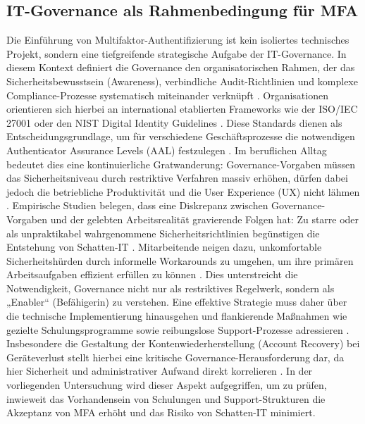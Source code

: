 \subsection{IT-Governance als Rahmenbedingung für MFA}
Die Einführung von Multifaktor-Authentifizierung ist kein isoliertes technisches Projekt, sondern eine tiefgreifende strategische Aufgabe der IT-Governance. In diesem Kontext definiert die Governance den organisatorischen Rahmen, der das Sicherheitsbewusstsein ({Awareness}), verbindliche Audit-Richtlinien und komplexe Compliance-Prozesse systematisch miteinander verknüpft \cite[S. 6]{1}. 
Organisationen orientieren sich hierbei an international etablierten Frameworks wie der ISO/IEC 27001 oder den {NIST Digital Identity Guidelines} \cite[S. 6]{1}. Diese Standards dienen als Entscheidungsgrundlage, um für verschiedene Geschäftsprozesse die notwendigen {Authenticator Assurance Levels} (AAL) festzulegen \cite[S. 6, 13]{1}. Im beruflichen Alltag bedeutet dies eine kontinuierliche Gratwanderung: Governance-Vorgaben müssen das Sicherheitsniveau durch restriktive Verfahren massiv erhöhen, dürfen dabei jedoch die betriebliche Produktivität und die User Experience ({UX}) nicht lähmen \cite[S. 154]{1}. 
Empirische Studien belegen, dass eine Diskrepanz zwischen Governance-Vorgaben und der gelebten Arbeitsrealität gravierende Folgen hat: Zu starre oder als unpraktikabel wahrgenommene Sicherheitsrichtlinien begünstigen die Entstehung von Schatten-IT \cite[S. 66]{1}. Mitarbeitende neigen dazu, unkomfortable Sicherheitshürden durch informelle Workarounds zu umgehen, um ihre primären Arbeitsaufgaben effizient erfüllen zu können \cite[S. 1, 66]{1}. Dies unterstreicht die Notwendigkeit, Governance nicht nur als restriktives Regelwerk, sondern als „Enabler“ (Befähigerin) zu verstehen. 
Eine effektive Strategie muss daher über die technische Implementierung hinausgehen und flankierende Maßnahmen wie gezielte Schulungsprogramme sowie reibungslose Support-Prozesse adressieren \cite[S. 2, 4]{1}. Insbesondere die Gestaltung der Kontenwiederherstellung ({Account Recovery}) bei Geräteverlust stellt hierbei eine kritische Governance-Herausforderung dar, da hier Sicherheit und administrativer Aufwand direkt korrelieren \cite[S. 5446]{1}. In der vorliegenden Untersuchung wird dieser Aspekt aufgegriffen, um zu prüfen, inwieweit das Vorhandensein von Schulungen und Support-Strukturen die Akzeptanz von MFA erhöht und das Risiko von Schatten-IT minimiert.%

